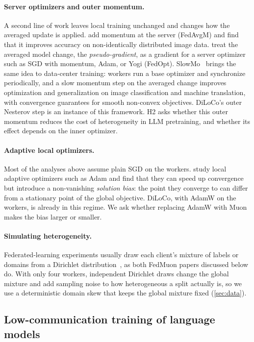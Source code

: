 \documentclass{article}
\begin{document}
\paragraph{Server optimizers and outer momentum.} A second line of work leaves local training unchanged and changes how the averaged update is applied. \citet{hsu2019measuring} add momentum at the server (FedAvgM) and find that it improves accuracy on non-identically distributed image data. \citet{reddi2021adaptive} treat the averaged model change, the \emph{pseudo-gradient}, as a gradient for a server optimizer such as SGD with momentum, Adam, or Yogi (FedOpt). SlowMo~\cite{wang2020slowmo} brings the same idea to data-center training: workers run a base optimizer and synchronize periodically, and a slow momentum step on the averaged change improves optimization and generalization on image classification and machine translation, with convergence guarantees for smooth non-convex objectives. DiLoCo's outer Nesterov step is an instance of this framework. H2 asks whether this outer momentum reduces the cost of heterogeneity in LLM pretraining, and whether its effect depends on the inner optimizer.

\paragraph{Adaptive local optimizers.} Most of the analyses above assume plain SGD on the workers. \citet{wang2021localadaptivity} study local adaptive optimizers such as Adam and find that they can speed up convergence but introduce a non-vanishing \emph{solution bias}: the point they converge to can differ from a stationary point of the global objective. DiLoCo, with AdamW on the workers, is already in this regime. We ask whether replacing AdamW with Muon makes the bias larger or smaller.

\paragraph{Simulating heterogeneity.} Federated-learning experiments usually draw each client's mixture of labels or domains from a Dirichlet distribution~\cite{hsu2019measuring}, as both FedMuon papers discussed below do. With only four workers, independent Dirichlet draws change the global mixture and add sampling noise to how heterogeneous a split actually is, so we use a deterministic domain skew that keeps the global mixture fixed (\cref{sec:data}).

\subsection{Low-communication training of language models}
\end{document}
